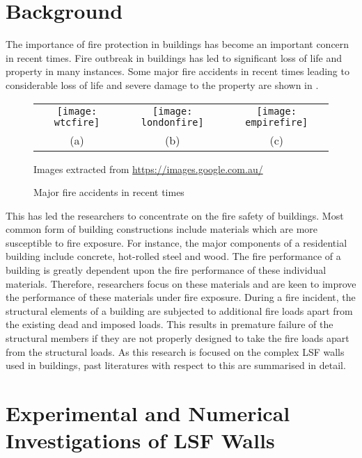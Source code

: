 \section{Background}
The importance of fire protection in buildings has become an important concern in recent times. Fire outbreak in buildings has led to significant loss of life and property in many instances. Some major fire accidents in recent times leading to considerable loss of life and severe damage to the property are shown in . 
\begin{figure}[htbp]
	\centering
		\begin{tabular}{ccc}
			\texttt{[image: wtcfire]} & 
			\texttt{[image: londonfire]} &
			\texttt{[image: empirefire]} \\ 
			(a) & (b) & (c) \\ 
		\end{tabular} 

	\begin{scriptsize}
	Images extracted from \url{https://images.google.com.au/}
	\end{scriptsize}
	
		\caption{Major fire accidents in recent times}
		\label{fig:Major fire accidents}
\end{figure}

This has led the researchers to concentrate on the fire safety of buildings. Most common form of building constructions include materials which are more susceptible to fire exposure. For instance, the major components of a residential building include concrete, hot-rolled steel and wood. The fire performance of a building is greatly dependent upon the fire performance of these individual materials. Therefore, researchers focus on these materials and are keen to improve the performance of these materials under fire exposure. During a fire incident, the structural elements of a building are subjected to additional fire loads apart from the existing dead and imposed loads. This results in premature failure of the structural members if they are not properly designed to take the fire loads apart from the structural loads. As this research is focused on the complex LSF walls used in buildings, past literatures with respect to this are summarised in detail.

\section{Experimental and Numerical Investigations of LSF Walls}

